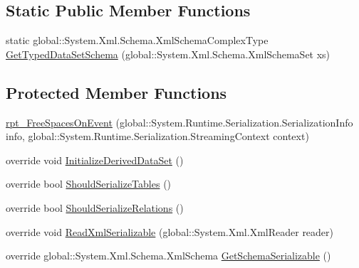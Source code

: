 \subsection*{Static Public Member Functions}
\begin{DoxyCompactItemize}
\item 
static global\+::\+System.\+Xml.\+Schema.\+Xml\+Schema\+Complex\+Type \hyperlink{classprj_progra_i_i_i_1_1rpt___free_spaces_on_event_a154035cd1f8b30ec221c366ebf50d75b}{Get\+Typed\+Data\+Set\+Schema} (global\+::\+System.\+Xml.\+Schema.\+Xml\+Schema\+Set xs)
\end{DoxyCompactItemize}
\subsection*{Protected Member Functions}
\begin{DoxyCompactItemize}
\item 
\hyperlink{classprj_progra_i_i_i_1_1rpt___free_spaces_on_event_a7337e4fa1c372671526ead3b22854b28}{rpt\+\_\+\+Free\+Spaces\+On\+Event} (global\+::\+System.\+Runtime.\+Serialization.\+Serialization\+Info info, global\+::\+System.\+Runtime.\+Serialization.\+Streaming\+Context context)
\item 
override void \hyperlink{classprj_progra_i_i_i_1_1rpt___free_spaces_on_event_a038f97041ca0fe3bdb95e2757c8ad74e}{Initialize\+Derived\+Data\+Set} ()
\item 
override bool \hyperlink{classprj_progra_i_i_i_1_1rpt___free_spaces_on_event_a29f352bac92cd416a967007938cca0cd}{Should\+Serialize\+Tables} ()
\item 
override bool \hyperlink{classprj_progra_i_i_i_1_1rpt___free_spaces_on_event_ab551797102c97baa079f92ed6b39a18d}{Should\+Serialize\+Relations} ()
\item 
override void \hyperlink{classprj_progra_i_i_i_1_1rpt___free_spaces_on_event_aae8b21abc3604c87d10fab9ad31a780f}{Read\+Xml\+Serializable} (global\+::\+System.\+Xml.\+Xml\+Reader reader)
\item 
override global\+::\+System.\+Xml.\+Schema.\+Xml\+Schema \hyperlink{classprj_progra_i_i_i_1_1rpt___free_spaces_on_event_a627cb3a651bf604cd4ed8d875454d820}{Get\+Schema\+Serializable} ()
\end{DoxyCompactItemize}
